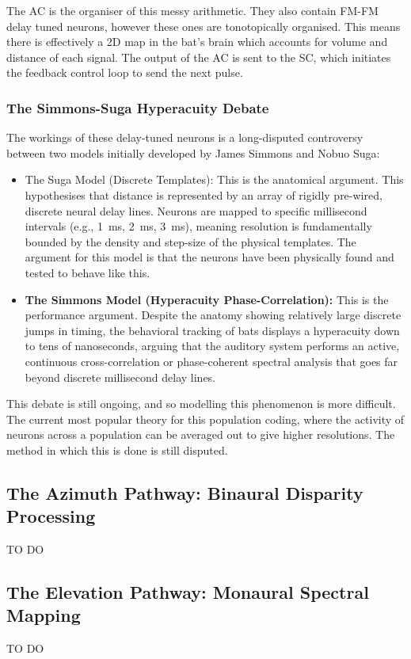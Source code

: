 The AC is the organiser of this messy arithmetic. They also contain FM-FM delay tuned neurons, however these ones are tonotopically organised. This means there is effectively a 2D map in the bat's brain which accounts for volume and distance of each signal. The output of the AC is sent to the SC, which initiates the feedback control loop to send the next pulse.

\subsubsection{The Simmons-Suga Hyperacuity Debate}
The workings of these delay-tuned neurons is a long-disputed controversy between two models initially developed by  James Simmons and Nobuo Suga:
\begin{itemize}
    \item {The Suga Model (Discrete Templates):} This is the anatomical argument. This hypothesises that distance is represented by an array of rigidly pre-wired, discrete neural delay lines. Neurons are mapped to specific millisecond intervals (e.g., 1~ms, 2~ms, 3~ms), meaning resolution is fundamentally bounded by the density and step-size of the physical templates. The argument for this model is that the neurons have been physically found and tested to behave like this.
    \item \textbf{The Simmons Model (Hyperacuity Phase-Correlation):} This is the performance argument. Despite the anatomy showing relatively large discrete jumps in timing, the behavioral tracking of bats displays a hyperacuity down to tens of nanoseconds, arguing that the auditory system performs an active, continuous cross-correlation or phase-coherent spectral analysis that goes far beyond discrete millisecond delay lines.
\end{itemize}
 This debate is still ongoing, and so modelling this phenomenon is more difficult. The current most popular theory for this population coding, where the activity of neurons across a population can be averaged out to give higher resolutions. The method in which this is done is still disputed.


\subsection{The Azimuth Pathway: Binaural Disparity Processing}
\label{sec:azimuth_pathway}
TO DO

\subsection{The Elevation Pathway: Monaural Spectral Mapping}
\label{sec:elevation_pathway}
TO DO









